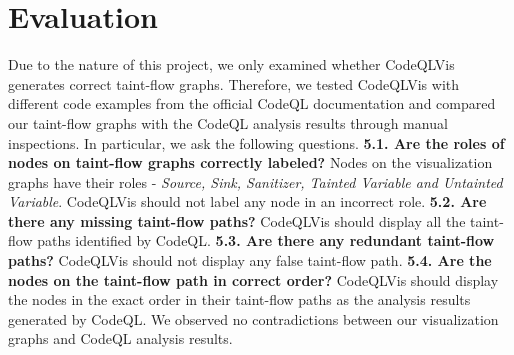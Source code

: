 \documentclass[sigplan,10pt,review]{acmart}
\begin{document}
\section{Evaluation}
Due to the nature of this project, we only examined whether CodeQLVis generates correct taint-flow graphs. Therefore, we tested CodeQLVis with different code examples from the official CodeQL documentation and compared our taint-flow graphs with the CodeQL analysis results through manual inspections. In particular, we ask the following questions.
\newline
\newline
\textbf{5.1. Are the roles of nodes on taint-flow graphs correctly labeled? }
\newline
Nodes on the visualization graphs have their roles - \textit{Source, Sink, Sanitizer, Tainted Variable and Untainted Variable}. CodeQLVis should not label any node in an incorrect role.
\newline
\newline
\textbf{5.2. Are there any missing taint-flow paths? }
\newline
CodeQLVis should display all the taint-flow paths identified by CodeQL.
\newline
\newline
\textbf{5.3. Are there any redundant taint-flow paths? }
\newline
CodeQLVis should not display any false taint-flow path.
\newline
\newline
\textbf{5.4. Are the nodes on the taint-flow path in correct order? }
\newline
CodeQLVis should display the nodes in the exact order in their taint-flow paths as the analysis results generated by CodeQL.
\newline
\newline
We observed no contradictions between our visualization graphs and CodeQL analysis results.
\end{document}
